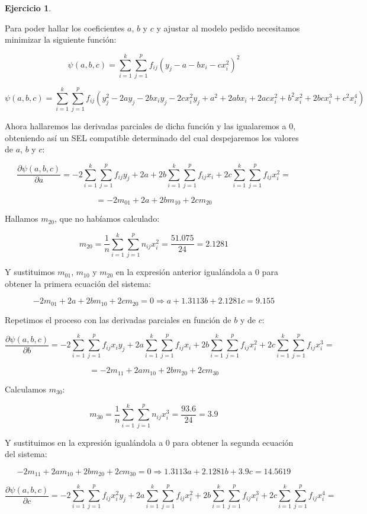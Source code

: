 \documentclass[a4paper, 12pt]{article}
\theoremstyle{definition}
\newtheorem{ej}{Ejercicio}
\begin{document}
\begin{ej}
\begin{enumerate}[label=\alph*)]
Para poder hallar los coeficientes $a$, $b$ y $c$ y ajustar al modelo pedido necesitamos minimizar la siguiente función:

\[
    \psi(a,b,c) = \sum_{i=1}^{k}\sum_{j=1}^{p}f_{ij}(y_j-a-bx_i-cx_{i}^{2})^2
\]

\[
    \psi(a,b,c) = \sum_{i=1}^{k}\sum_{j=1}^{p}f_{ij}(y_{j}^2-2ay_j-2bx_i y_j -2cx_{i}^{2}y_j+a^2+2abx_i+2acx_{i}^{2}+b^2 x_{i}^{2}+2bcx_{i}^{3}+c^2 x_{i}^{4})
\]

Ahora hallaremos las derivadas parciales de dicha función y las igualaremos a 0, obteniendo así un SEL compatible determinado del cual despejaremos los valores de $a$, $b$ y $c$:

\[
    \frac{\partial\psi(a,b,c)}{\partial a} = -2\sum_{i=1}^{k}\sum_{j=1}^{p}f_{ij}y_j + 2a + 2b\sum_{i=1}^{k}\sum_{j=1}^{p}f_{ij}x_i + 2c\sum_{i=1}^{k}\sum_{j=1}^{p}f_{ij}x_{i}^{2} = 
\]

\[
    = -2m_{01}+2a+2bm_{10}+2cm_{20}
\]

Hallamos $m_{20}$, que no habíamos calculado:

\[
    m_{20} = \frac{1}{n}\sum_{i=1}^{k}\sum_{j=1}^{p}n_{ij}x_{i}^{2} = \frac{51.075}{24} = 2.1281
\]

Y sustituimos $m_{01}$, $m_{10}$ y $m_{20}$ en la expresión anterior igualándola a 0 para obtener la primera ecuación del sistema:

\[
    -2m_{01}+2a+2bm_{10}+2cm_{20} = 0 \Rightarrow a+1.3113b+2.1281c=9.155
\]

Repetimos el proceso con las derivadas parciales en función de $b$ y de $c$:

\[
    \frac{\partial\psi(a,b,c)}{\partial b} = -2\sum_{i=1}^{k}\sum_{j=1}^{p}f_{ij}x_i y_j + 2a\sum_{i=1}^{k}\sum_{j=1}^{p}f_{ij}x_i + 2b\sum_{i=1}^{k}\sum_{j=1}^{p}f_{ij}x_{i}^{2}+ 2c\sum_{i=1}^{k}\sum_{j=1}^{p}f_{ij}x_{i}^{3} = 
\]

\[
    = -2m_{11}+2am_{10}+2bm_{20}+2cm_{30}
\]

\newpage

Calculamos $m_{30}$:

\[
    m_{30} = \frac{1}{n}\sum_{i=1}^{k}\sum_{j=1}^{p}n_{ij}x_{i}^{3} = \frac{93.6}{24} = 3.9
\]

Y sustituimos en la expresión igualándola a 0 para obtener la segunda ecuación del sistema:

\[
    -2m_{11}+2am_{10}+2bm_{20}+2cm_{30} = 0 \Rightarrow 1.3113a+2.1281b+3.9c=14.5619
\]

\[
    \frac{\partial\psi(a,b,c)}{\partial c} = -2\sum_{i=1}^{k}\sum_{j=1}^{p}f_{ij}x_{i}^{2} y_j + 2a\sum_{i=1}^{k}\sum_{j=1}^{p}f_{ij}x_{i}^{2} + 2b\sum_{i=1}^{k}\sum_{j=1}^{p}f_{ij}x_{i}^{3}+ 2c\sum_{i=1}^{k}\sum_{j=1}^{p}f_{ij}x_{i}^{4} = 
\]


\end{enumerate}
\end{ej}
\end{document}
